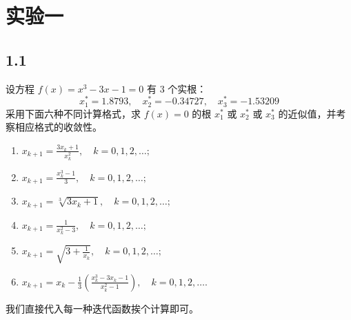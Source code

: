 

\section{实验一}

\subsection*{1.1}
设方程 $f(x) = x^3 - 3x - 1 = 0$ 有 3 个实根：
\[
x_1^* = 1.8793, \quad x_2^* = -0.34727, \quad x_3^* = -1.53209
\]
采用下面六种不同计算格式，求 $f(x) = 0$ 的根 $x_1^*$ 或 $x_2^*$ 或 $x_3^*$ 的近似值，并考察相应格式的收敛性。

\begin{enumerate}
    \item $x_{k+1} = \frac{3x_k + 1}{x_k^2}, \quad k = 0, 1, 2, \ldots;$
    \item $x_{k+1} = \frac{x_k^3 - 1}{3}, \quad k = 0, 1, 2, \ldots;$
    \item $x_{k+1} = \sqrt[3]{3x_k + 1}, \quad k = 0, 1, 2, \ldots;$
    \item $x_{k+1} = \frac{1}{x_k^2 - 3}, \quad k = 0, 1, 2, \ldots;$
    \item $x_{k+1} = \sqrt{3 + \frac{1}{x_k}}, \quad k = 0, 1, 2, \ldots;$
    \item $x_{k+1} = x_k - \frac{1}{3} \left( \frac{x_k^3 - 3x_k - 1}{x_k^2 - 1} \right), \quad k = 0, 1, 2, \ldots.$
\end{enumerate}

我们直接代入每一种迭代函数挨个计算即可。

